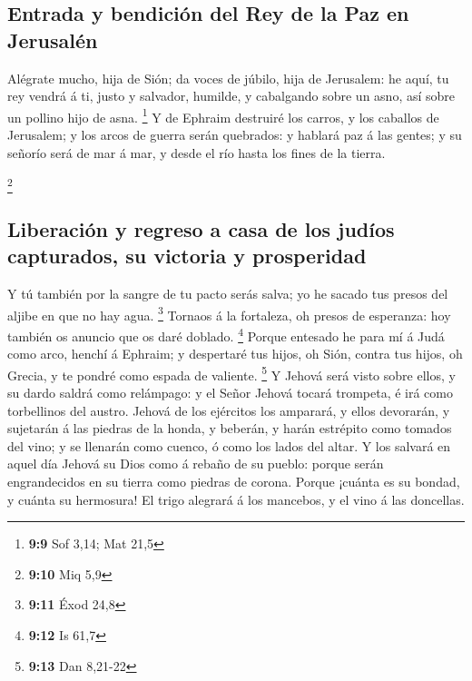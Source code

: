 \hypertarget{entrada-y-bendiciuxf3n-del-rey-de-la-paz-en-jerusaluxe9n}{%
\subsection{Entrada y bendición del Rey de la Paz en
Jerusalén}\label{entrada-y-bendiciuxf3n-del-rey-de-la-paz-en-jerusaluxe9n}}

 Alégrate mucho, hija de Sión; da voces de júbilo, hija de
Jerusalem: he aquí, tu rey vendrá á ti, justo y salvador, humilde, y
cabalgando sobre un asno, así sobre un pollino hijo de asna. \footnote{\textbf{9:9}
  Sof 3,14; Mat 21,5}  Y de Ephraim destruiré los carros,
y los caballos de Jerusalem; y los arcos de guerra serán quebrados: y
hablará paz á las gentes; y su señorío será de mar á mar, y desde el río
hasta los fines de la tierra.

\footnote{\textbf{9:10} Miq 5,9}

\hypertarget{liberaciuxf3n-y-regreso-a-casa-de-los-juduxedos-capturados-su-victoria-y-prosperidad}{%
\subsection{Liberación y regreso a casa de los judíos capturados, su
victoria y
prosperidad}\label{liberaciuxf3n-y-regreso-a-casa-de-los-juduxedos-capturados-su-victoria-y-prosperidad}}

 Y tú también por la sangre de tu pacto serás salva; yo
he sacado tus presos del aljibe en que no hay agua. \footnote{\textbf{9:11}
  Éxod 24,8}  Tornaos á la fortaleza, oh presos de
esperanza: hoy también os anuncio que os daré doblado. \footnote{\textbf{9:12}
  Is 61,7}  Porque entesado he para mí á Judá como arco,
henchí á Ephraim; y despertaré tus hijos, oh Sión, contra tus hijos, oh
Grecia, y te pondré como espada de valiente. \footnote{\textbf{9:13} Dan
  8,21-22}  Y Jehová será visto sobre ellos, y su dardo
saldrá como relámpago: y el Señor Jehová tocará trompeta, é irá como
torbellinos del austro.  Jehová de los ejércitos los
amparará, y ellos devorarán, y sujetarán á las piedras de la honda, y
beberán, y harán estrépito como tomados del vino; y se llenarán como
cuenco, ó como los lados del altar.  Y los salvará en
aquel día Jehová su Dios como á rebaño de su pueblo: porque serán
engrandecidos en su tierra como piedras de corona. 
Porque ¡cuánta es su bondad, y cuánta su hermosura! El trigo alegrará á
los mancebos, y el vino á las doncellas.

